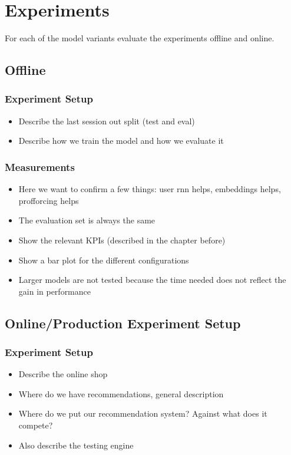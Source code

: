 \chapter{Experiments}
For each of the model variants evaluate the experiments offline and online.
\section{Offline}
\subsection{Experiment Setup}\label{sec:exp_setup}
\begin{itemize}
    \item Describe the last session out split (test and eval)
    \item Describe how we train the model and how we evaluate it
\end{itemize}
\subsection{Measurements}
\begin{itemize}
    \item Here we want to confirm a few things: user rnn helps, embeddings helps, profforcing helps
    \item The evaluation set is always the same
    \item Show the relevant KPIs (described in the chapter before)
    \item Show a bar plot for the different configurations
    \item Larger models are not tested because the time needed does not reflect the gain in performance
\end{itemize}

\section{Online/Production Experiment Setup}
\subsection{Experiment Setup}
\begin{itemize}
    \item Describe the online shop
    \item Where do we have recommendations, general description
    \item Where do we put our recommendation system? Against what does it compete?
    \item Also describe the testing engine
\end{itemize}
